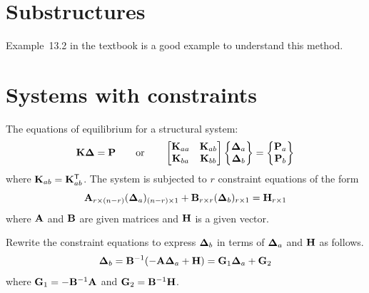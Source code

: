 \section{Substructures}
Example~13.2 in the textbook is a good example to understand this method.

\section{Systems with constraints}
The equations of equilibrium for a structural system:
\begin{equation}
  \mathbf{K}\bm{\Delta} = \mathbf{P}\qquad\text{or}\qquad \begin{bmatrix}\mathbf{K}_{aa} & \mathbf{K}_{ab}\\ \mathbf{K}_{ba} & \mathbf{K}_{bb}\end{bmatrix}\begin{Bmatrix}\bm{\Delta}_a\\ \bm{\Delta}_b\end{Bmatrix} = \begin{Bmatrix}\mathbf{P}_a\\ \mathbf{P}_b\end{Bmatrix}
\end{equation}
where $\mathbf{K}_{ab} = \mathbf{K}_{ab}^{\mathsf{T}}$. The system is subjected to $r$ constraint equations of the form
\begin{equation}
  \mathbf{A}_{r\times(n-r)}(\bm{\Delta}_a)_{(n-r)\times1} + \mathbf{B}_{r\times r}(\bm{\Delta}_b)_{r\times1} = \mathbf{H}_{r\times1}
\end{equation}
where $\mathbf{A}$ and $\mathbf{B}$ are given matrices and $\mathbf{H}$ is a given vector.

Rewrite the constraint equations to express $\bm{\Delta}_b$ in terms of $\bm{\Delta}_a$ and $\mathbf{H}$ as follows.
\begin{equation}
  \bm{\Delta}_b = \mathbf{B}^{-1}(-\mathbf{A}\bm{\Delta}_a + \mathbf{H}) = \mathbf{G}_1\bm{\Delta}_a + \mathbf{G}_2
\end{equation}
where $\mathbf{G}_1 = -\mathbf{B}^{-1}\mathbf{A}$ and $\mathbf{G}_2 = \mathbf{B}^{-1}\mathbf{H}$.

